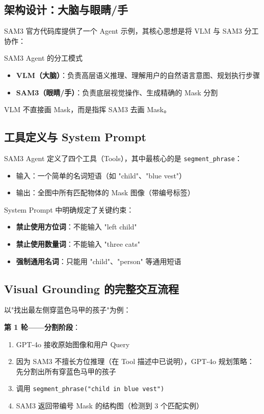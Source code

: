 \documentclass[a4paper]{article}
\begin{document}
\subsection{架构设计：大脑与眼睛/手}

SAM3 官方代码库提供了一个 Agent 示例，其核心思想是将 VLM 与 SAM3 分工协作：

\begin{importantbox}{SAM3 Agent 的分工模式}
\begin{itemize}
    \item \textbf{VLM（大脑）}：负责高层语义推理、理解用户的自然语言意图、规划执行步骤
    \item \textbf{SAM3（眼睛/手）}：负责底层视觉操作、生成精确的 Mask 分割
\end{itemize}
VLM 不直接画 Mask，而是指挥 SAM3 去画 Mask。
\end{importantbox}

\subsection{工具定义与 System Prompt}

SAM3 Agent 定义了四个工具（Tools），其中最核心的是 \texttt{segment\_phrase}：

\begin{itemize}
    \item 输入：一个简单的名词短语（如 "child"、"blue vest"）
    \item 输出：全图中所有匹配物体的 Mask 图像（带编号标签）
\end{itemize}

System Prompt 中明确规定了关键约束：
\begin{itemize}
    \item \textbf{禁止使用方位词}：不能输入 "left child"
    \item \textbf{禁止使用数量词}：不能输入 "three cats"
    \item \textbf{强制通用名词}：只能用 "child"、"person" 等通用短语
\end{itemize}

\subsection{Visual Grounding 的完整交互流程}

以"找出最左侧穿蓝色马甲的孩子"为例：

\textbf{第 1 轮——分割阶段}：
\begin{enumerate}
    \item GPT-4o 接收原始图像和用户 Query
    \item 因为 SAM3 不擅长方位推理（在 Tool 描述中已说明），GPT-4o 规划策略：先分割出所有穿蓝色马甲的孩子
    \item 调用 \texttt{segment\_phrase("child in blue vest")}
    \item SAM3 返回带编号 Mask 的结构图（检测到 3 个匹配实例）
\end{enumerate}
\end{document}
